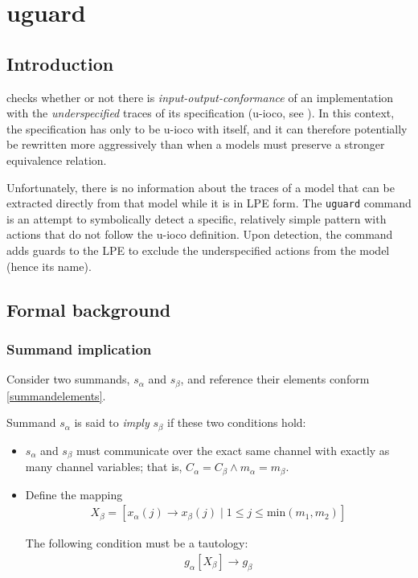 \chapter{uguard}

\section{Introduction}

\txs{} checks whether or not there is \emph{input-output-conformance} of an implementation with the \emph{underspecified} traces of its specification (u-ioco, see \cite{volpato2013towards}).
In this context, the specification has only to be u-ioco with itself, and it can therefore potentially be rewritten more aggressively than when a models must preserve a stronger equivalence relation.

Unfortunately, there is no information about the traces of a model that can be extracted directly from that model while it is in LPE form.
The \texttt{uguard} command is an attempt to symbolically detect a specific, relatively simple pattern with actions that do not follow the u-ioco definition.
Upon detection, the command adds guards to the LPE to exclude the underspecified actions from the model (hence its name).

\section{Formal background}

\subsection{Summand implication}

Consider two summands, $s_\alpha$ and $s_\beta$, and reference their elements conform \ref{summandelements}.

Summand $s_\alpha$ is said to \emph{imply} $s_\beta$ if these two conditions hold:

\begin{itemize}
\item $s_\alpha$ and $s_\beta$ must communicate over the exact same channel with exactly as many channel variables; that is, $C_\alpha = C_\beta \land m_\alpha = m_\beta$.

\item Define the mapping
\begin{align*}
X_\beta = [x_\alpha(j) \rightarrow x_\beta(j) \;|\; 1 \leq j \leq \text{min}(m_1, m_2)]
\end{align*}

The following condition must be a tautology:
\begin{align*}
g_\alpha[X_\beta] \rightarrow g_\beta
\end{align*}
\end{itemize}

